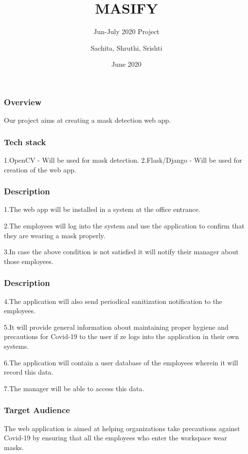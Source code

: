 \documentclass[14pt]{beamer}
\title{MASIFY}
\subtitle{Jun-July 2020 Project}
\author[TEAM 6]{Sachita, Shruthi, Srishti}
\date{June 2020}
\begin{document}
\begin{frame}
    \titlepage
\end{frame}

\begin{frame}
    \frametitle{Overview}
    Our project aims at creating a mask detection web app.
\end{frame}

\begin{frame}
    \frametitle{Tech stack}
    1.OpenCV - Will be used for mask detection.
    2.Flask/Django - Will be used for creation of the web app.
\end{frame} 

\begin{frame}
    \frametitle{Description}
    1.The web app will be installed in a system at the office entrance.

    2.The employees will log into the system and use the application to confirm that they are wearing a mask properly.

    3.In case the above condition is not satisfied it will notify their manager about those employees.
\end{frame}

\begin{frame}
    \frametitle{Description}
    4.The application will also send periodical sanitization notification to the employees.
    
    5.It will provide general information about maintaining proper hygiene and precautions for Covid-19 to the user if ze logs into the application in their own systems.
    
    6.The application will contain a user database of the employees wherein it will record this data.
    
    7.The manager will be able to access this data.
\end{frame}

\begin{frame}
    \frametitle{Target Audience}
    The web application is  aimed at helping organizations take precautions against Covid-19 by ensuring that all the employees who enter the workspace wear masks.
\end{frame}
\end{document}
